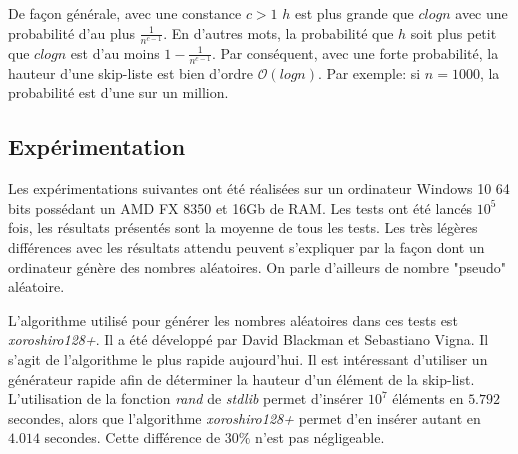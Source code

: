 \documentclass[hidelinks,a4paper, 12pt]{article}
\begin{document}
	 De façon générale, avec une constance $c>1$ $h$ est plus grande que $c log n$ avec une probabilité d'au plus $\frac{1}{n^{c-1}}$. En d'autres mots, la probabilité que $h$ soit plus petit que $c log n$ est d'au moins $1-\frac{1}{n^{c-1}}$. Par conséquent, avec une forte probabilité, la hauteur d'une skip-liste est bien d'ordre $\mathcal{O}(log n)$. Par exemple: si $n=1000$, la probabilité est d'une sur un million.
	
	
	\subsection{Expérimentation}
	
	Les expérimentations suivantes ont été réalisées sur un ordinateur Windows 10 64 bits possédant un AMD FX 8350 et 16Gb de RAM. Les tests ont été lancés $10^5$ fois, les résultats présentés sont la moyenne de tous les tests. Les très légères différences avec les résultats attendu peuvent s'expliquer par la façon dont un ordinateur génère des nombres aléatoires. On parle d'ailleurs de nombre "pseudo" aléatoire.
	
	L'algorithme utilisé pour générer les nombres aléatoires dans ces tests est \textit{xoroshiro128+}. Il a été développé par David Blackman et Sebastiano Vigna. Il s'agit de l'algorithme le plus rapide aujourd'hui. Il est intéressant d'utiliser un générateur rapide afin de déterminer la hauteur d'un élément de la skip-list. L'utilisation de la fonction \textit{rand} de \textit{stdlib} permet d'insérer $10^7$ éléments en $5.792$ secondes, alors que l'algorithme \textit{xoroshiro128+} permet d'en insérer autant en $4.014$ secondes. Cette différence de $30\%$ n'est pas négligeable.
	
\end{document}
